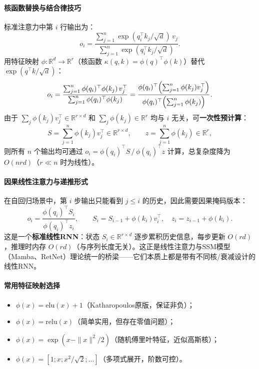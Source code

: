 \documentclass[12pt,a4paper]{article}
\begin{document}
\paragraph{核函数替换与结合律技巧}

标准注意力中第 $i$ 行输出为：
\begin{equation}
o_i = \frac{\sum_{j=1}^n \exp(q_i^\top k_j / \sqrt{d})\, v_j}{\sum_{j=1}^n \exp(q_i^\top k_j / \sqrt{d})}.
\end{equation}
用特征映射 $\phi: \mathbb{R}^d \to \mathbb{R}^r$（核函数 $\kappa(q,k) = \phi(q)^\top\phi(k)$）替代 $\exp(q^\top k/\sqrt{d})$：
\begin{equation}
o_i = \frac{\sum_{j=1}^n \phi(q_i)^\top\phi(k_j)\, v_j^\top}{\sum_{j=1}^n \phi(q_i)^\top\phi(k_j)}
= \frac{\phi(q_i)^\top \Bigl(\sum_{j=1}^n \phi(k_j) v_j^\top\Bigr)}{\phi(q_i)^\top \Bigl(\sum_{j=1}^n \phi(k_j)\Bigr)}.
\end{equation}
由于 $\sum_j \phi(k_j) v_j^\top \in \mathbb{R}^{r \times d}$ 和 $\sum_j \phi(k_j) \in \mathbb{R}^r$ 均与 $i$ 无关，可\textbf{一次性预计算}：
\begin{equation}
S = \sum_{j=1}^n \phi(k_j) v_j^\top \in \mathbb{R}^{r \times d},\qquad z = \sum_{j=1}^n \phi(k_j) \in \mathbb{R}^r,
\end{equation}
则所有 $n$ 个输出均可通过 $o_i = \phi(q_i)^\top S\, /\, \phi(q_i)^\top z$ 计算，总复杂度降为 $O(nrd)$（$r \ll n$ 时为线性）。

\paragraph{因果线性注意力与递推形式}

在自回归场景中，第 $i$ 步输出只能看到 $j \le i$ 的历史，因此需要因果掩码版本：
\begin{equation}
o_i = \frac{\phi(q_i)^\top S_i}{\phi(q_i)^\top z_i},\qquad
S_i = S_{i-1} + \phi(k_i) v_i^\top,\quad
z_i = z_{i-1} + \phi(k_i).
\end{equation}
这是一个\textbf{标准线性RNN}：状态 $S_i \in \mathbb{R}^{r \times d}$ 逐步累积历史信息，每步更新 $O(rd)$，推理时内存 $O(rd)$（与序列长度无关）。这正是线性注意力与SSM模型（Mamba、RetNet）理论统一的桥梁——它们本质上都是带有不同核/衰减设计的线性RNN。

\paragraph{常用特征映射选择}

\begin{itemize}
    \item $\phi(x) = \mathrm{elu}(x) + 1$（Katharopoulos原版，保证非负）；
    \item $\phi(x) = \mathrm{relu}(x)$（简单实用，但存在零值问题）；
    \item $\phi(x) = \exp(x - \|x\|^2/2)$（随机傅里叶特征，近似高斯核）；
    \item $\phi(x) = [1; x; x^2/\sqrt{2}; \ldots]$（多项式展开，阶数可控）。
\end{itemize}
\end{document}
